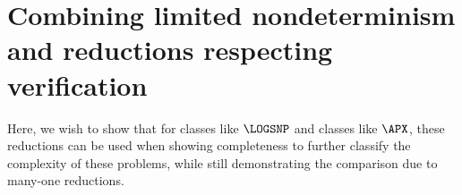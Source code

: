 \documentclass{article}
\begin{document}
\section{Combining limited nondeterminism and reductions respecting verification}

Here, we wish to show that for classes like $\LOGSNP$ and classes like $\APX$, these reductions can be used when showing completeness to further classify the complexity of these problems, while still demonstrating the comparison due to many-one reductions.

\printbibliography
\end{document}
